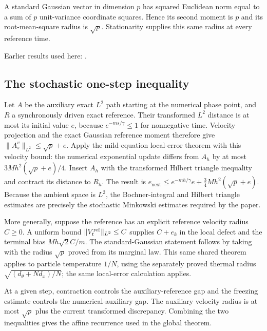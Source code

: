 \documentclass[11pt,a4paper]{report}
\begin{document}
A standard Gaussian vector in dimension \(p\) has squared Euclidean norm equal to a sum of \(p\) unit-variance coordinate squares. Hence its second moment is \(p\) and its root-mean-square radius is \(\sqrt p\). Stationarity supplies this same radius at every reference time.



Earlier results used here: \cite[Section~3.24.4]{LangevinLean2026ULASC}.
\subsection{\texorpdfstring{The stochastic one-step inequality}{The stochastic one-step inequality}}
\label{report-step-KineticLangevin-LpOneStep-lean-2}


Let \(A\) be the auxiliary exact \(L^{2}\) path starting at the numerical phase point, and \(R\) a synchronously driven exact reference. Their transformed \(L^{2}\) distance is at most its initial value \(e\), because \(e^{-ms/\gamma}\le1\) for nonnegative time. Velocity projection and the exact Gaussian reference moment therefore give \(\|A_s^v\|_{L^2}\le\sqrt p+e\). Apply the mild-equation local-error theorem with this velocity bound: the numerical exponential update differs from \(A_h\) by at most \(3Mh^2(\sqrt p+e)/4\). Insert \(A_h\) with the transformed Hilbert triangle inequality and contract its distance to \(R_h\). The result is \(e_{\mathrm{next}}\le e^{-mh/\gamma}e+\frac34Mh^2(\sqrt p+e)\). Because the ambient space is \(L^{2}\), the Bochner-integral and Hilbert triangle estimates are precisely the stochastic Minkowski estimates required by the paper.



More generally, suppose the reference has an explicit reference velocity radius \(C\ge0\). A uniform bound \(\|V_t^{\rm ref}\|_{L^2}\le C\) supplies \(C+e_k\) in the local defect and the terminal bias \(Mh\sqrt2C/m\). The standard-Gaussian statement follows by taking with the radius \(\sqrt p\) proved from its marginal law. This same shared theorem applies to particle temperature \(1/N\), using the separately proved thermal radius \(\sqrt{(d_\theta+Nd_x)/N}\); the same local-error calculation applies.



At a given step, contraction controls the auxiliary-reference gap and the freezing estimate controls the numerical-auxiliary gap. The auxiliary velocity radius is at most \(\sqrt p\) plus the current transformed discrepancy. Combining the two inequalities gives the affine recurrence used in the global theorem.
\end{document}
